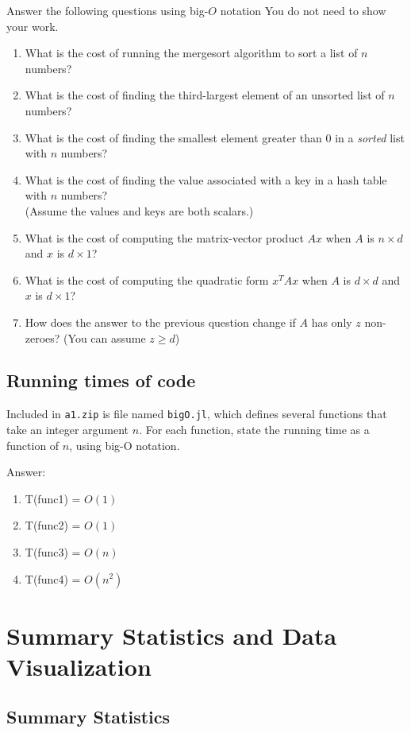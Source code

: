 \documentclass{article}
\def\ans#1{\par\gre{Answer: #1}}
\def\blu#1{{\color{blu}#1}}
\def\gre#1{{\color{gre}#1}}
\begin{document}
\blu{Answer the following questions using big-$O$ notation} You do not need to show your work.
\begin{enumerate}
\item What is the cost of running the mergesort algorithm to sort  a list of $n$ numbers?
\item What is the cost of finding the third-largest element of an unsorted list of $n$ numbers?
\item What is the cost of finding the smallest element greater than 0 in a \emph{sorted} list with $n$ numbers?
\item What is the cost of finding the value associated with a key in a hash table with $n$ numbers? \\(Assume the values and keys are both scalars.)
\item What is the cost of computing the matrix-vector product $Ax$ when $A$ is $n \times d$ and $x$ is $d \times 1$?
\item What is the cost of computing the quadratic form $x^TAx$ when $A$ is $d \times d$ and $x$ is $d \times 1$?
\item How does the answer to the previous question change if $A$ has only $z$ non-zeroes? (You can assume $z \geq d$)
\end{enumerate}

\subsection{Running times of code}

Included in \texttt{a1.zip} is file named \texttt{bigO.jl}, which defines several functions
that take an integer argument $n$. For each function, \blu{state the running time as a function of $n$, using big-O notation}.

\ans{
	\begin{enumerate}
		\item T(func1) = $O(1)$
		\item T(func2) = $O(1)$
		\item T(func3) = $O(n)$
		\item T(func4) = $O(n^2)$
	\end{enumerate}
}

\section{Summary Statistics and Data Visualization}

\subsection{Summary Statistics}
\end{document}
